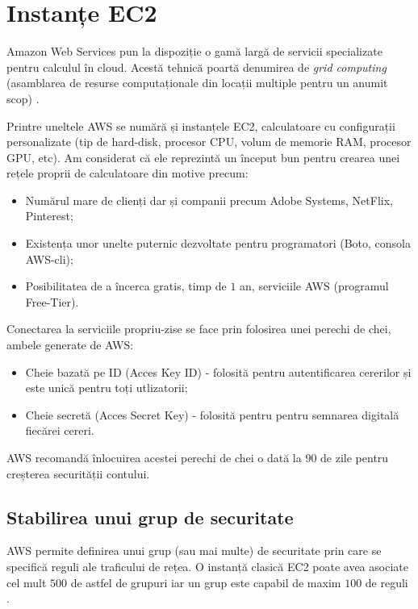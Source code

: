 \documentclass[oneside, 12pt]{book}
\begin{document}
\section{Instanțe EC2}

Amazon Web Services pun la dispoziție o gamă largă de servicii specializate pentru calculul în cloud. Acestă tehnică poartă denumirea de \textit{grid computing} (asamblarea de resurse computaționale din locații multiple pentru un anumit scop) \cite{garfinkel2007evaluation}.

Printre uneltele AWS se numără și instanțele EC2, calculatoare cu configurații personalizate (tip de hard-disk, procesor CPU, volum de memorie RAM, procesor GPU, etc). Am considerat că ele reprezintă un început bun pentru crearea unei rețele proprii de calculatoare din motive precum:
\begin{itemize}
 	\item Numărul mare de clienți dar și companii precum Adobe Systems, NetFlix, Pinterest;
 	\item Existența unor unelte puternic dezvoltate pentru programatori (Boto, consola AWS-cli);
 	\item Posibilitatea de a încerca gratis, timp de $1$ an, serviciile AWS (programul Free-Tier).
\end{itemize}

Conectarea la serviciile propriu-zise se face prin folosirea unei perechi de chei, ambele generate de AWS:
\begin{itemize}
	\item Cheie bazată pe ID (Acces Key ID) - folosită pentru autentificarea cererilor și este unică pentru toți utlizatorii;
	\item Cheie secretă (Acces Secret Key) - folosită pentru pentru semnarea digitală fiecărei cereri.
\end{itemize}

AWS recomandă înlocuirea acestei perechi de chei o dată la $90$ de zile pentru creșterea securității contului.

\subsection{Stabilirea unui grup de securitate}

AWS permite definirea unui grup (sau mai multe) de securitate prin care se specifică reguli ale traficului de rețea. O instanță clasică EC2 poate avea asociate cel mult $500$ de astfel de grupuri iar un grup este capabil de maxim $100$ de reguli \cite{website:aws-docs}.
\end{document}
